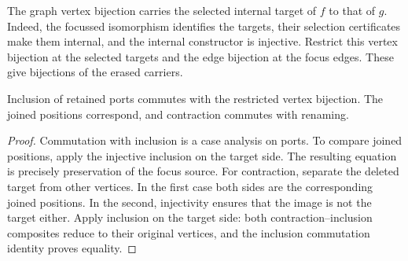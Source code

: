 The graph vertex bijection carries the selected internal target of $f$ to
that of $g$. Indeed, the focussed isomorphism identifies the targets, their
selection certificates make them internal, and the internal constructor is
injective. Restrict this vertex bijection at the selected targets and the edge
bijection at the focus edges. These give bijections of the erased carriers.

\begin{lemma}
Inclusion of retained ports commutes with the restricted vertex bijection.
The joined positions correspond, and contraction commutes with renaming.
\end{lemma}
\begin{proof}
Commutation with inclusion is a case analysis on ports. To compare joined
positions, apply the injective inclusion on the target side. The resulting
equation is precisely preservation of the focus source. For contraction,
separate the deleted target from other vertices. In the first case both sides
are the corresponding joined positions. In the second, injectivity ensures
that the image is not the target either. Apply inclusion on the target side:
both contraction--inclusion composites reduce to their original vertices,
and the inclusion commutation identity proves equality.
\end{proof}

